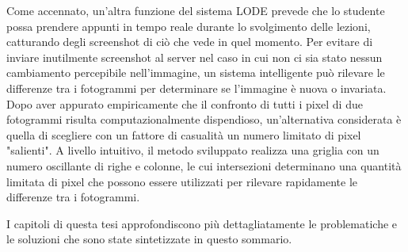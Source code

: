Come accennato, un'altra funzione del sistema LODE prevede che lo studente possa prendere appunti in tempo reale durante lo svolgimento delle lezioni, catturando degli screenshot di ciò che vede in quel momento. Per evitare di inviare inutilmente screenshot al server nel caso in cui non ci sia stato nessun cambiamento percepibile nell'immagine, un sistema intelligente può rilevare le differenze tra i fotogrammi per determinare se l'immagine è nuova o invariata. Dopo aver appurato empiricamente che il confronto di tutti i pixel di due fotogrammi risulta computazionalmente dispendioso, un'alternativa considerata è quella di scegliere con un fattore di casualità un numero limitato di pixel "salienti". A livello intuitivo, il metodo sviluppato realizza una griglia con un numero oscillante di righe e colonne, le cui intersezioni determinano una quantità limitata di pixel che possono essere utilizzati per rilevare rapidamente le differenze tra i fotogrammi.

I capitoli di questa tesi approfondiscono più dettagliatamente le problematiche e le soluzioni che sono state sintetizzate in questo sommario.


